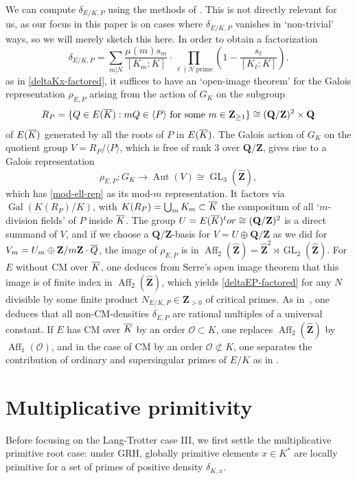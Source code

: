 \documentclass{amsart}
\theoremstyle{plain}
\theoremstyle{definition}
\DeclareMathOperator{\Aut}{Aut}
\DeclareMathOperator{\Aff}{Aff}
\DeclareMathOperator{\GL}{GL}
\DeclareMathOperator{\Gal}{Gal}
\newcommand{\OO}{\mathcal{O}}
\newcommand{\Que}{{\mathbf{Q}}}
\newcommand{\Zee}{{\mathbf{Z}}}
\newcommand{\Zhat}{{\widehat {\Zee}}}
\newcommand{\tto}{\longrightarrow}
\newcommand{\iso}{\cong}
\newcommand{\tor}{\textup{tor}}
\newcommand{\mybar}[1]{
  \mathchoice
  {#1\llap{$\overline{\phantom{\displaystyle\rm#1}}$}}
  {#1\llap{$\overline{\phantom{\textstyle\rm#1}}$}}
  {#1\llap{$\overline{\phantom{\scriptstyle\rm#1}}$}}
  {#1\llap{$\overline{\phantom{\scriptscriptstyle\rm#1}}$}}
}
\renewcommand{\bar}{\mybar}
\begin{document}
We can compute $\delta_{E/K, P}$ using the methods of \cite{Campagna-Stevenhagen}.
This is not directly relevant for us, as our focus in this paper is on cases
where $\delta_{E/K, P}$ vanishes in `non-trivial' ways, so we will merely sketch this here.
In order to obtain a factorization 
\begin{equation}
\label{deltaEP-factored}
\delta_{E/K,P}=
\sum_{m|N} \frac{\mu(m)s_m}{[K_m:K]}\cdot
   \prod_{\ell\nmid N \text{ prime}} (1-\frac{s_\ell}{[K_\ell:K]}).
\end{equation}
as in \eqref{deltaKx-factored}, it suffices to have 
an `open-image theorem' for the Galois representation $\rho_{E,P}$ 
arising from the action of $G_K$ on the subgroup
\[
R_P=\{Q\in E(\bar K): m Q\in \langle P\rangle
\text{ for some } m\in \Zee_{\ge1}\} \cong (\Que/\Zee)^2\times \Que
\]
of $E(\bar K)$ generated by all the roots of $P$ in $E(\bar K)$.
The Galois action of $G_K$ on the quotient group $V=R_P/\langle P\rangle$, 
which is free of rank 3 over $\Que/\Zee$, gives rise to a Galois representation 
\[
\rho_{E,P}: G_K \tto \Aut(V)\iso \GL_3(\Zhat),
\]
which has \eqref{mod-ell-rep} as its mod-$m$ representation.
It factors via $\Gal(K(R_P)/K)$, with $K(R_P)=\bigcup_m K_m\subset \bar K$ 
the compositum of all `$m$-division fields' of $P$ inside $\bar K$.
The group $U=E(\overline K)^\tor\iso (\Que/\Zee)^2$ is a direct summand of $V$,
and if we choose a $\Que/\Zee$-basis for $V=U\oplus \Que/\Zee$ 
as we did for $V_m=U_m\oplus \Zee/m\Zee\cdot\bar Q$,
the image of $\rho_{E,P}$ is in $\Aff_2(\Zhat)=\Zhat^2\rtimes \GL_2(\Zhat)$.
For $E$ without CM over $\bar K$, one deduces from Serre's open image theorem
that this image is of finite index in $\Aff_2(\Zhat)$, 
which yields \eqref{deltaEP-factored} for any $N$ divisible by some
finite product $N_{E/K,P}\in\Zee_{>0}$ of critical primes.
As in~\cite{Campagna-Stevenhagen}, one deduces that all non-CM-densities $\delta_{E,P}$
are rational multiples of a universal constant.
If $E$ has CM over $\bar K$ by an order $\OO\subset K$, 
one replaces $\Aff_2(\Zhat)$ by $\Aff_1(\OO)$,
and in the case of CM by an order $\OO\not\subset K$, one separates 
the contribution of ordinary and supersingular primes of $E/K$ 
as in \cite{Campagna-Stevenhagen}.


\section{Multiplicative primitivity}
\label{S:multiplicative primitivity}

\noindent
Before focusing on the Lang-Trotter case III, 
we first settle the multiplicative primitive root case: under GRH,
globally primitive elements $x\in K^*$ are locally primitive
for a set of primes of positive density $\delta_{K,x}$.
\end{document}
